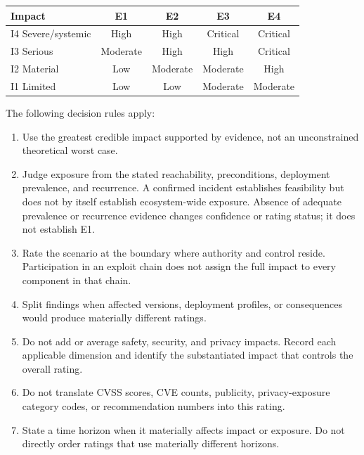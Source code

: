 \documentclass[../main.tex]{subfiles}
\begin{document}
\begin{center}
\begin{minipage}{0.90\linewidth}
\centering
\small
\setlength{\tabcolsep}{4pt}
\renewcommand{\arraystretch}{1.2}
\label{tab:inherent-risk-matrix}
\begin{tabular}{@{}lcccc@{}}
\hline
\textbf{Impact} & \textbf{E1} & \textbf{E2} & \textbf{E3} & \textbf{E4} \\
\hline
I4 Severe/systemic & High     & High     & Critical & Critical \\
I3 Serious         & Moderate & High     & High     & Critical \\
I2 Material        & Low      & Moderate & Moderate & High \\
I1 Limited         & Low      & Low      & Moderate & Moderate \\
\hline
\end{tabular}
\end{minipage}
\end{center}

The following decision rules apply:

\begin{enumerate}
    \item Use the greatest credible impact supported by evidence, not an
          unconstrained theoretical worst case.
    \item Judge exposure from the stated reachability, preconditions, deployment
          prevalence, and recurrence. A confirmed incident establishes
          feasibility but does not by itself establish ecosystem-wide exposure.
          Absence of adequate prevalence or recurrence evidence changes
          confidence or rating status; it does not establish E1.
    \item Rate the scenario at the boundary where authority and control reside.
          Participation in an exploit chain does not assign the full impact to
          every component in that chain.
    \item Split findings when affected versions, deployment profiles, or
          consequences would produce materially different ratings.
    \item Do not add or average safety, security, and privacy impacts. Record
          each applicable dimension and identify the substantiated impact that
          controls the overall rating.
    \item Do not translate CVSS scores, CVE counts, publicity, privacy-exposure
          category codes, or recommendation numbers into this rating.
    \item State a time horizon when it materially affects impact or exposure.
          Do not directly order ratings that use materially different horizons.
\end{enumerate}
\end{document}
